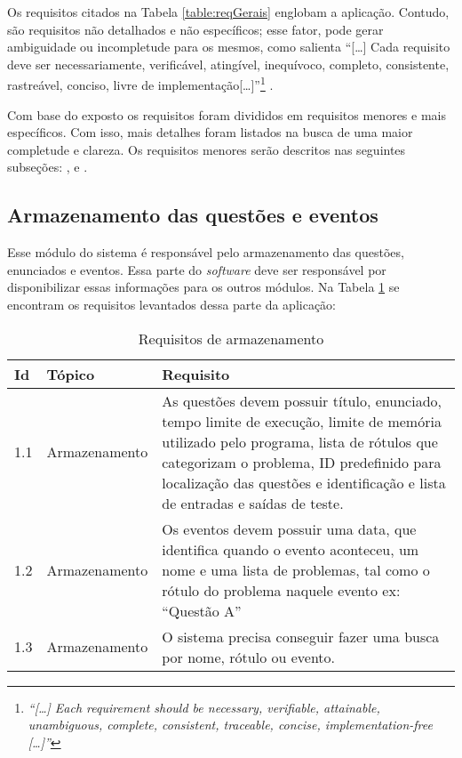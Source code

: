 Os requisitos citados na Tabela \ref{table:reqGerais} englobam a aplicação. Contudo, são requisitos não detalhados e não específicos; esse fator, pode gerar ambiguidade ou incompletude para os mesmos, como salienta ``[\dots] Cada requisito deve ser necessariamente, verificável, atingível, inequívoco, completo, consistente, rastreável, conciso, livre de implementação[\dots]''\footnote{\textit{``[\dots] Each requirement should be necessary, verifiable, attainable, unambiguous, complete, consistent, traceable, concise, implementation-free [\dots]''}} \cite[p.9, tradução nossa]{young2002recommended}.

Com base do exposto os requisitos foram divididos em requisitos menores e mais específicos. Com isso, mais detalhes foram listados na busca de uma maior completude e clareza. Os requisitos menores serão descritos nas seguintes subseções: ,  e .

\subsection{Armazenamento das questões e eventos}
\label{subsec:storage}

Esse módulo do sistema é responsável pelo armazenamento das questões, enunciados e eventos. Essa parte do \textit{software} deve ser responsável por disponibilizar essas informações para os outros módulos. Na Tabela \ref{table:reqArmazenamento} se encontram os requisitos levantados dessa parte da aplicação:

\begin{table}[ht]
    \caption{Requisitos de armazenamento}
    \centering
    \label{table:reqArmazenamento}
    \begin{tabular}{ |p{0.6cm}|p{3cm}|p{10cm}|  }
        \hline
        
        \textbf{Id} & 
        \textbf{Tópico} & 
        \textbf{Requisito} \\
        \hline
        
        1.1 & 
        Armazenamento   & 
        As questões devem possuir título, enunciado, tempo limite de execução, limite de memória utilizado pelo programa, lista de rótulos que categorizam o problema, ID predefinido para localização das questões e identificação e lista de entradas e saídas de teste. \\
        \hline
        
        1.2 & 
        Armazenamento & 
        Os eventos devem possuir uma data, que identifica quando o evento aconteceu, um nome e uma lista de problemas, tal como o rótulo do problema naquele evento ex: “Questão A”  \\ 
        \hline
        
        1.3 & 
        Armazenamento & 
        O sistema precisa conseguir fazer uma busca por nome, rótulo ou evento.  \\
        \hline
    \end{tabular}

\end{table}

